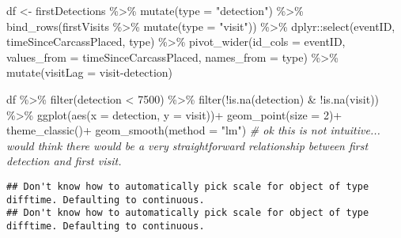 \documentclass[
]{article}
\newenvironment{Shaded}{\begin{snugshade}}{\end{snugshade}}
\newcommand{\AttributeTok}[1]{\textcolor[rgb]{0.77,0.63,0.00}{#1}}
\newcommand{\CommentTok}[1]{\textcolor[rgb]{0.56,0.35,0.01}{\textit{#1}}}
\newcommand{\DecValTok}[1]{\textcolor[rgb]{0.00,0.00,0.81}{#1}}
\newcommand{\FunctionTok}[1]{\textcolor[rgb]{0.00,0.00,0.00}{#1}}
\newcommand{\NormalTok}[1]{#1}
\newcommand{\OtherTok}[1]{\textcolor[rgb]{0.56,0.35,0.01}{#1}}
\newcommand{\SpecialCharTok}[1]{\textcolor[rgb]{0.00,0.00,0.00}{#1}}
\newcommand{\StringTok}[1]{\textcolor[rgb]{0.31,0.60,0.02}{#1}}
\begin{document}
\begin{Shaded}
\begin{Highlighting}[]
\NormalTok{df }\OtherTok{\textless{}{-}}\NormalTok{ firstDetections }\SpecialCharTok{\%\textgreater{}\%}
  \FunctionTok{mutate}\NormalTok{(}\AttributeTok{type =} \StringTok{"detection"}\NormalTok{) }\SpecialCharTok{\%\textgreater{}\%}
  \FunctionTok{bind\_rows}\NormalTok{(firstVisits }\SpecialCharTok{\%\textgreater{}\%}
              \FunctionTok{mutate}\NormalTok{(}\AttributeTok{type =} \StringTok{"visit"}\NormalTok{)) }\SpecialCharTok{\%\textgreater{}\%}
\NormalTok{  dplyr}\SpecialCharTok{::}\FunctionTok{select}\NormalTok{(eventID, timeSinceCarcassPlaced, type) }\SpecialCharTok{\%\textgreater{}\%}
  \FunctionTok{pivot\_wider}\NormalTok{(}\AttributeTok{id\_cols =}\NormalTok{ eventID, }\AttributeTok{values\_from =}\NormalTok{ timeSinceCarcassPlaced, }\AttributeTok{names\_from =}\NormalTok{ type) }\SpecialCharTok{\%\textgreater{}\%}
  \FunctionTok{mutate}\NormalTok{(}\AttributeTok{visitLag =}\NormalTok{ visit}\SpecialCharTok{{-}}\NormalTok{detection)}

\NormalTok{df }\SpecialCharTok{\%\textgreater{}\%}
  \FunctionTok{filter}\NormalTok{(detection }\SpecialCharTok{\textless{}} \DecValTok{7500}\NormalTok{) }\SpecialCharTok{\%\textgreater{}\%}
  \FunctionTok{filter}\NormalTok{(}\SpecialCharTok{!}\FunctionTok{is.na}\NormalTok{(detection) }\SpecialCharTok{\&} \SpecialCharTok{!}\FunctionTok{is.na}\NormalTok{(visit)) }\SpecialCharTok{\%\textgreater{}\%}
  \FunctionTok{ggplot}\NormalTok{(}\FunctionTok{aes}\NormalTok{(}\AttributeTok{x =}\NormalTok{ detection, }\AttributeTok{y =}\NormalTok{ visit))}\SpecialCharTok{+}
  \FunctionTok{geom\_point}\NormalTok{(}\AttributeTok{size =} \DecValTok{2}\NormalTok{)}\SpecialCharTok{+}
  \FunctionTok{theme\_classic}\NormalTok{()}\SpecialCharTok{+}
  \FunctionTok{geom\_smooth}\NormalTok{(}\AttributeTok{method =} \StringTok{"lm"}\NormalTok{) }\CommentTok{\# ok this is not intuitive... would think there would be a very straightforward relationship between first detection and first visit.}
\end{Highlighting}
\end{Shaded}

\begin{verbatim}
## Don't know how to automatically pick scale for object of type difftime. Defaulting to continuous.
## Don't know how to automatically pick scale for object of type difftime. Defaulting to continuous.
\end{verbatim}
\end{document}
